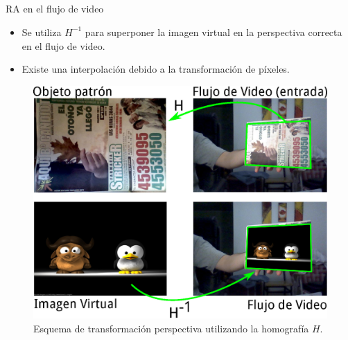 \subsection*{}
\begin{frame}{RA en el flujo de video}
  \begin{itemize}
    \item Se utiliza $H^{-1}$ para superponer la imagen virtual en la perspectiva correcta en el flujo de video.
    \item Existe una interpolación debido a la transformación de píxeles.
  \end{itemize}

  \begin{figure}[tbhp]
   \centering
        \includegraphics[scale=0.4]{../../figs/transfperspectiva_presentacion}
    \caption[\small{Esquema de transformación perspectiva}]{\small{Esquema de transformación perspectiva utilizando la homografía $H$.}}
   \label{fig:transf_pespectiva}
  \end{figure}
\end{frame}